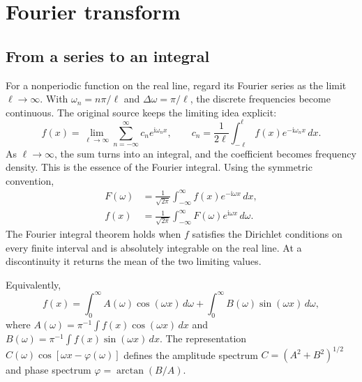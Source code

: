 \section{Fourier transform}

\subsection{From a series to an integral}

For a nonperiodic function on the real line, regard its Fourier series as the limit $\ell\to\infty$. With $\omega_n=n\pi/\ell$ and $\Delta\omega=\pi/\ell$, the discrete frequencies become continuous. The original source keeps the limiting idea explicit:
\begin{equation}
f(x)=\lim_{\ell\to\infty}\sum_{n=-\infty}^{\infty} c_n e^{\mathrm{i}\omega_n x},
\qquad
c_n=\frac{1}{2\ell}\int_{-\ell}^{\ell}f(x)e^{-\mathrm{i}\omega_n x}\,dx.
\end{equation}
As $\ell\to\infty$, the sum turns into an integral, and the coefficient becomes frequency density. This is the essence of the Fourier integral. Using the symmetric convention,
\begin{align}
F(\omega)&=\frac{1}{\sqrt{2\pi}}\int_{-\infty}^{\infty}f(x)e^{-\mathrm{i}\omega x}\,dx,\\
f(x)&=\frac{1}{\sqrt{2\pi}}\int_{-\infty}^{\infty}F(\omega)e^{\mathrm{i}\omega x}\,d\omega.
\end{align}
The Fourier integral theorem holds when $f$ satisfies the Dirichlet conditions on every finite interval and is absolutely integrable on the real line. At a discontinuity it returns the mean of the two limiting values.

Equivalently,
\begin{equation}
f(x)=\int_0^\infty A(\omega)\cos(\omega x)\,d\omega+
\int_0^\infty B(\omega)\sin(\omega x)\,d\omega,
\end{equation}
where $A(\omega)=\pi^{-1}\int f(x)\cos(\omega x)\,dx$ and $B(\omega)=\pi^{-1}\int f(x)\sin(\omega x)\,dx$. The representation $C(\omega)\cos[\omega x-\varphi(\omega)]$ defines the amplitude spectrum $C=(A^2+B^2)^{1/2}$ and phase spectrum $\varphi=\arctan(B/A)$.

